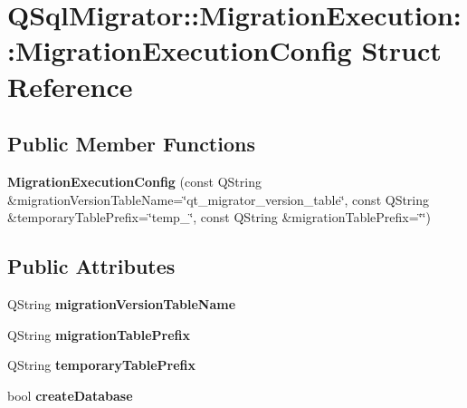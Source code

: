\hypertarget{struct_q_sql_migrator_1_1_migration_execution_1_1_migration_execution_config}{}\section{Q\+Sql\+Migrator\+:\+:Migration\+Execution\+:\+:Migration\+Execution\+Config Struct Reference}
\label{struct_q_sql_migrator_1_1_migration_execution_1_1_migration_execution_config}
\subsection*{Public Member Functions}
\begin{DoxyCompactItemize}
\item 
\mbox{\label{struct_q_sql_migrator_1_1_migration_execution_1_1_migration_execution_config_add618c11ce7c7bb154258305e095db1e}} 
{\bfseries Migration\+Execution\+Config} (const Q\+String \&migration\+Version\+Table\+Name=\char`\"{}qt\+\_\+migrator\+\_\+version\+\_\+table\char`\"{}, const Q\+String \&temporary\+Table\+Prefix=\char`\"{}temp\+\_\+\char`\"{}, const Q\+String \&migration\+Table\+Prefix=\char`\"{}\char`\"{})
\end{DoxyCompactItemize}
\subsection*{Public Attributes}
\begin{DoxyCompactItemize}
\item 
\mbox{\label{struct_q_sql_migrator_1_1_migration_execution_1_1_migration_execution_config_a91d1eaf99b6ac2567d69f38ec7a37c43}} 
Q\+String {\bfseries migration\+Version\+Table\+Name}
\item 
\mbox{\label{struct_q_sql_migrator_1_1_migration_execution_1_1_migration_execution_config_acdf207f727a954d39a6f8514adaf82c4}} 
Q\+String {\bfseries migration\+Table\+Prefix}
\item 
\mbox{\label{struct_q_sql_migrator_1_1_migration_execution_1_1_migration_execution_config_a5ed90881db0be3ed8814de622d6155a8}} 
Q\+String {\bfseries temporary\+Table\+Prefix}
\item 
\mbox{\label{struct_q_sql_migrator_1_1_migration_execution_1_1_migration_execution_config_a4b71cd98e6e8147c1e68af485b808544}} 
bool {\bfseries create\+Database}
\end{DoxyCompactItemize}


